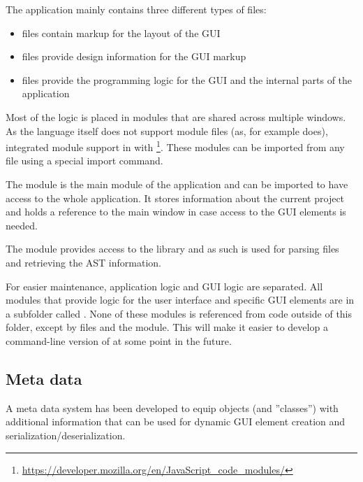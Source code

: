 The application mainly contains three different types of files:

\begin{itemize}\addtolength{\itemsep}{-0.5\baselineskip}
\item {} files contain markup for the layout of the GUI
\item {} files provide design information for the GUI markup
\item {} files provide the programming logic for the GUI and the internal parts of the application
\end{itemize}

Most of the  logic is placed in modules that are shared across multiple windows. As the  language itself does not support module files (as, for example  does),  integrated module support in  with \footnote{\url{https://developer.mozilla.org/en/JavaScript_code_modules/}}. These modules can be imported from any  file using a special import command.

The  module is the main module of the application and can be imported to have access to the whole application. It stores information about the current project and holds a reference to the main window in case access to the GUI elements is needed.

The  module provides access to the  library and as such is used for parsing  files and retrieving the AST information.

For easier maintenance, application logic and GUI logic are separated. All modules that provide logic for the user interface and specific GUI elements are in a subfolder called . None of these modules is referenced from code outside of this folder, except by  files and the  module. This will make it easier to develop a command-line version of  at some point in the future.

\subsection{Meta data}
\label{sec:MetaData}

A meta data system has been developed to equip  objects (and ''classes'') with additional information that can be used for dynamic GUI element creation and serialization/deserialization.

